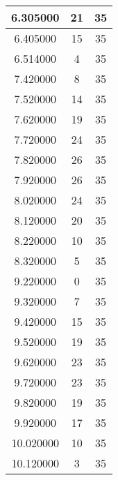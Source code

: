 \begin{longtable}[htbp]{|c|c|c|}
6.305000 & 21 & 35 \\ \hline
6.405000 & 15 & 35 \\ \hline
6.514000 & 4 & 35 \\ \hline
7.420000 & 8 & 35 \\ \hline
7.520000 & 14 & 35 \\ \hline
7.620000 & 19 & 35 \\ \hline
7.720000 & 24 & 35 \\ \hline
7.820000 & 26 & 35 \\ \hline
7.920000 & 26 & 35 \\ \hline
8.020000 & 24 & 35 \\ \hline
8.120000 & 20 & 35 \\ \hline
8.220000 & 10 & 35 \\ \hline
8.320000 & 5 & 35 \\ \hline
9.220000 & 0 & 35 \\ \hline
9.320000 & 7 & 35 \\ \hline
9.420000 & 15 & 35 \\ \hline
9.520000 & 19 & 35 \\ \hline
9.620000 & 23 & 35 \\ \hline
9.720000 & 23 & 35 \\ \hline
9.820000 & 19 & 35 \\ \hline
9.920000 & 17 & 35 \\ \hline
10.020000 & 10 & 35 \\ \hline
10.120000 & 3 & 35 \\ \hline
\end{longtable}
